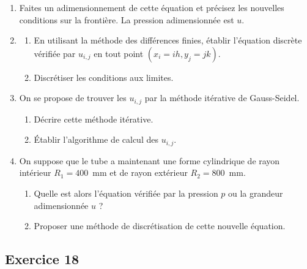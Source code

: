 \begin{enumerate}[label=\arabic*)-]
  \item Faites un adimensionnement de cette équation et précisez les nouvelles
        conditions sur la frontière. La pression adimensionnée est $u$.
  \item \begin{enumerate}[label=\alph*)-]
          \item En utilisant la méthode des différences finies, établir
                l'équation discrète vérifiée par $u_{i,j}$ en tout point
                $(x_i = ih, y_j = jk)$.
          \item Discrétiser les conditions aux limites.
        \end{enumerate}
  \item On se propose de trouver les $u_{i,j}$ par la méthode itérative de
        Gauss-Seidel.
        \begin{enumerate}[label=\alph*)-]
          \item Décrire cette méthode itérative.
          \item Établir l'algorithme de calcul des $u_{i,j}$.
        \end{enumerate}
  \item On suppose que le tube a maintenant une forme cylindrique de rayon
        intérieur $R_1 = 400$~mm et de rayon extérieur $R_2 = 800$~mm.
        \begin{enumerate}[label=\alph*)-]
          \item Quelle est alors l'équation vérifiée par la pression $p$ ou la
                grandeur adimensionnée $u$ ?
          \item Proposer une méthode de discrétisation de cette nouvelle
                équation.
        \end{enumerate}
\end{enumerate}

\subsection*{Exercice 18}

\begin{center}
\end{center}


